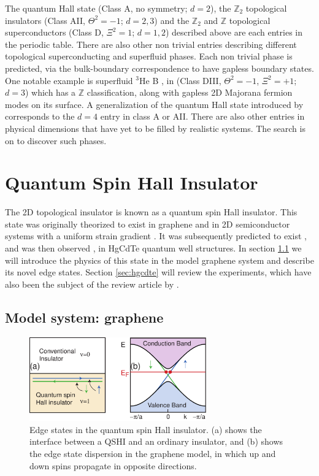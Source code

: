 \documentclass[twocolumn,floatfix,showpacs,rmp,aps]{revtex4}
\begin{document}
	
	
	The quantum Hall state (Class A, no symmetry; $d=2$), the $\mathbb{Z}_2$ topological
	insulators (Class AII, $\Theta^2=-1$; $d=2,3$) and the $\mathbb{Z}_2$ and $\mathbb{Z}$ topological
	superconductors (Class D, $\Xi^2=1$; $d=1,2$) described above are each entries in the periodic table.
	There are also other non trivial entries describing different topological
	superconducting and superfluid phases.  Each non trivial phase is predicted,
	via the bulk-boundary correspondence to have gapless boundary states.  One
	notable example is superfluid $^3$He B \cite{schnyder08,roy08,nagato09,qihughesraduzhang09,volovik03,volovik09}, in
	(Class DIII, $\Theta^2=-1$, $\Xi^2=+1$; $d=3$) which has a $\mathbb{Z}$
	classification, along with gapless 2D Majorana fermion modes on its
	surface.   A generalization of the quantum Hall state introduced by
	\textcite{zhang01} corresponds to the $d=4$ entry in class A or AII.
	There are also other entries
	in physical dimensions that have yet to
	be filled by realistic systems.  The search is on to discover such
	phases.
	
	
	\section{Quantum Spin Hall Insulator}
	\label{sec:qshi}
	
	The 2D topological insulator is known as a quantum spin
	Hall insulator.  This state was originally theorized to exist in
	graphene \cite{kanemele05a} and in 2D semiconductor systems with a uniform
	strain gradient \cite{bernevig06}.  It was subsequently predicted to exist \cite{bernevighugheszhang06}, and was
	then observed \cite{konig07}, in HgCdTe quantum well structures.  In section \ref{sec:graphene} we
	will introduce the physics of this state in the model graphene system
	and describe its novel edge states.  Section \ref{sec:hgcdte} will
	review the experiments, which have also been the subject of the review article
	by \textcite{konig08}.
	
	\subsection{Model system: graphene}
	\label{sec:graphene}
	
	\begin{figure}
		\includegraphics[width=3in]{Fig5}
		\caption{Edge states in the quantum spin Hall insulator.  (a) shows the interface between a
			QSHI and an ordinary insulator, and (b) shows the edge state dispersion in the graphene model,
			in which up and down spins propagate in opposite directions.}
		\label{fig:qshedge}
	\end{figure}
	
\end{document}
